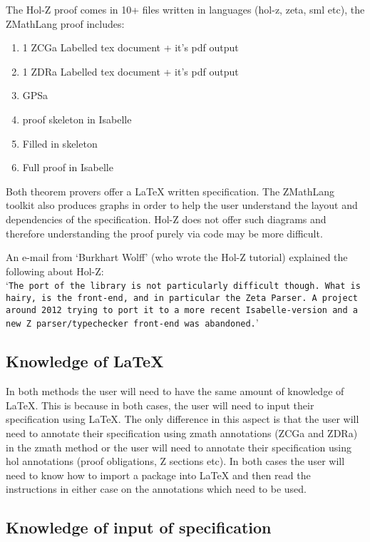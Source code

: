 The Hol-Z proof comes in 10+ files written in languages (hol-z, zeta, sml etc), the ZMathLang proof
includes:
\begin{enumerate}
    \item 1 ZCGa Labelled tex document + it's pdf output
    \item 1 ZDRa Labelled tex document + it's pdf output
    \item GPSa
    \item proof skeleton in Isabelle
    \item Filled in skeleton
    \item Full proof in Isabelle
\end{enumerate}

Both theorem provers offer a \LaTeX{} written specification.
The ZMathLang toolkit also produces graphs in order to help the user understand
the layout and dependencies of the specification. Hol-Z does not offer such diagrams and
therefore understanding the proof purely via code may be more difficult.

An e-mail from `Burkhart Wolff' (who wrote the Hol-Z tutorial) explained the following
about Hol-Z:
\\
`\texttt{The port of the library is not particularly difficult though.
What is hairy, is the front-end, and in particular the Zeta Parser.
A project around 2012 trying to port it to a more recent Isabelle-version
and a \\ new Z parser/typechecker front-end was abandoned.}'

\subsection{Knowledge of \LaTeX}

In both methods the user will need to have the same amount of knowledge of
\LaTeX{}. This is because in both cases, the user will need to input their
specification using \LaTeX{}. The only difference in this aspect is that the
user will need to annotate their specification using \gls{zmath} annotations
(ZCGa and ZDRa) in the \gls{zmath} method or the user will need to annotate
their specification using \gls{hol} annotations (proof obligations, Z sections
etc). In both cases the user will need to know how to import a package into
\LaTeX{} and then read the instructions in either case on the annotations which
need to be used.

\subsection{Knowledge of input of specification}
\label{knowledgeofinputforbb}

